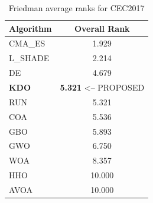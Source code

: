 \begin{table}[H]
\centering\small
\caption{Friedman average ranks for CEC2017}
\label{tab:cec2017_friedman}
\begin{tabular}{lc}
\toprule
\textbf{Algorithm} & \textbf{Overall Rank} \\
\midrule
CMA_ES & 1.929 \\
L_SHADE & 2.214 \\
DE & 4.679 \\
\textbf{KDO} & \textbf{5.321}  <-- PROPOSED \\
RUN & 5.321 \\
COA & 5.536 \\
GBO & 5.893 \\
GWO & 6.750 \\
WOA & 8.357 \\
HHO & 10.000 \\
AVOA & 10.000 \\
\bottomrule
\end{tabular}
\end{table}
